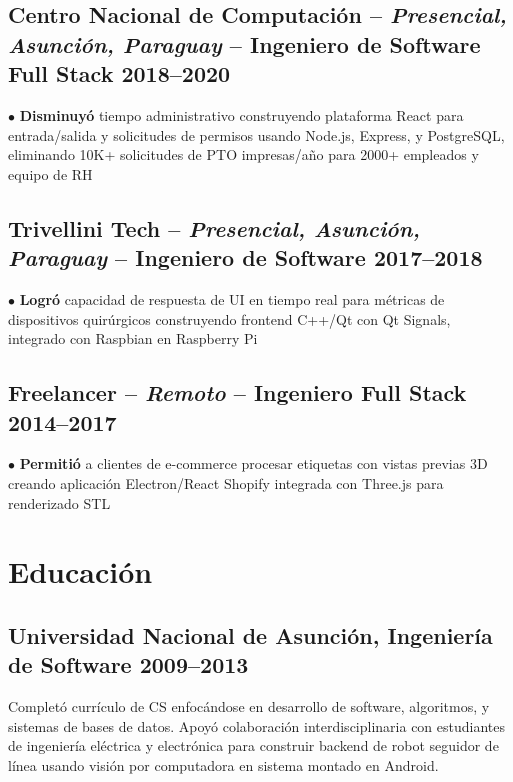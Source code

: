 \documentclass[10pt,a4paper]{article}
\newcommand{\actionverb}[1]{\textcolor{actioncolor}{\textbf{#1}}}
\newcommand{\cvsinglecompany}[5]{
  \subsection{#1 \textcolor{mediumgray}{#2} -- \textbf{\small #3} \hfill {\footnotesize\textcolor{mediumgray}{#4}}}
  {\footnotesize #5}
  \vspace{0.2em}
}
\newcommand{\cveducation}[4]{
  \subsection{#1, \textbf{\small #2} \hfill {\footnotesize\textcolor{mediumgray}{#3}}}
  {\footnotesize #4}
}
\begin{document}
\cvsinglecompany{Centro Nacional de Computación}{-- \textit{Presencial, Asunción, Paraguay}}{Ingeniero de Software Full Stack}{2018--2020}{
$\bullet$ \actionverb{Disminuyó} tiempo administrativo construyendo plataforma React para entrada/salida y solicitudes de permisos usando Node.js, Express, y PostgreSQL, eliminando 10K+ solicitudes de PTO impresas/año para 2000+ empleados y equipo de RH
}

\cvsinglecompany{Trivellini Tech}{-- \textit{Presencial, Asunción, Paraguay}}{Ingeniero de Software}{2017--2018}{
$\bullet$ \actionverb{Logró} capacidad de respuesta de UI en tiempo real para métricas de dispositivos quirúrgicos construyendo frontend C++/Qt con Qt Signals, integrado con Raspbian en Raspberry Pi
}

\cvsinglecompany{Freelancer}{-- \textit{Remoto}}{Ingeniero Full Stack}{2014--2017}{
$\bullet$ \actionverb{Permitió} a clientes de e-commerce procesar etiquetas con vistas previas 3D creando aplicación Electron/React Shopify integrada con Three.js para renderizado STL
}

\section{Educación}
\cveducation{Universidad Nacional de Asunción}{Ingeniería de Software}{2009--2013}{Completó currículo de CS enfocándose en desarrollo de software, algoritmos, y sistemas de bases de datos. Apoyó colaboración interdisciplinaria con estudiantes de ingeniería eléctrica y electrónica para construir backend de robot seguidor de línea usando visión por computadora en sistema montado en Android.}
\end{document}
